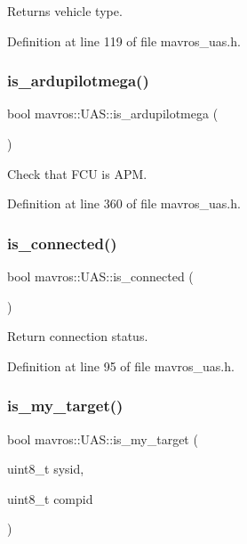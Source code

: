 Returns vehicle type. 



Definition at line 119 of file mavros\+\_\+uas.\+h.

\mbox{\label{group__nodelib_gad1a57410bba40929fd2aa443e8706695}} 
\subsubsection{\texorpdfstring{is\_ardupilotmega()}{is\_ardupilotmega()}}
{\footnotesize\ttfamily bool mavros\+::\+U\+A\+S\+::is\+\_\+ardupilotmega (\begin{DoxyParamCaption}{ }\end{DoxyParamCaption})\hspace{0.3cm}{\ttfamily [inline]}}



Check that F\+CU is A\+PM. 



Definition at line 360 of file mavros\+\_\+uas.\+h.

\mbox{\label{group__nodelib_gae5ac050d003fe823d5c483e7f636e91c}} 
\subsubsection{\texorpdfstring{is\_connected()}{is\_connected()}}
{\footnotesize\ttfamily bool mavros\+::\+U\+A\+S\+::is\+\_\+connected (\begin{DoxyParamCaption}{ }\end{DoxyParamCaption})\hspace{0.3cm}{\ttfamily [inline]}}



Return connection status. 



Definition at line 95 of file mavros\+\_\+uas.\+h.

\mbox{\label{group__nodelib_ga1ed3e59972054c99c9c5d7205bdbe3bc}} 
\subsubsection{\texorpdfstring{is\_my\_target()}{is\_my\_target()}\hspace{0.1cm}{\footnotesize\ttfamily [1/2]}}
{\footnotesize\ttfamily bool mavros\+::\+U\+A\+S\+::is\+\_\+my\+\_\+target (\begin{DoxyParamCaption}\item[{uint8\+\_\+t}]{sysid,  }\item[{uint8\+\_\+t}]{compid }\end{DoxyParamCaption})\hspace{0.3cm}{\ttfamily [inline]}}



